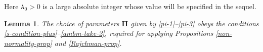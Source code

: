 \documentclass[12pt, twoside]{article}
\newtheorem{lemma}[theorem]{Lemma}
\theoremstyle{definition}
\numberwithin{equation}{section}
\begin{document}
\noindent Here $\mathtt A_0 > 0$ is a large absolute integer whose value will be specified in the sequel. 
\begin{lemma} \label{verification-lemma} 
The choice of parameters $\pmb{\Pi}$ given by \eqref{pi-1}--\eqref{pi-3} obeys the conditions \eqref{s-condition-plus}--\eqref{ambm-take-2}, required for applying Propositions \ref{non-normality-prop} and \ref{Rajchman-prop}.  
\end{lemma} 
\end{document}
